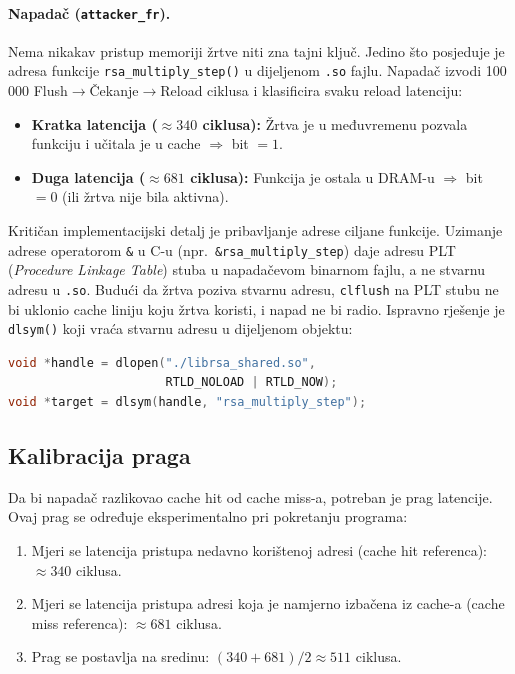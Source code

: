 \paragraph{Napadač (\texttt{attacker\_fr}).}
Nema nikakav pristup memoriji žrtve niti zna tajni ključ. Jedino što posjeduje je adresa funkcije \texttt{rsa\_multiply\_step()} u dijeljenom \texttt{.so} fajlu. Napadač izvodi 100\,000 Flush$\to$Čekanje$\to$Reload ciklusa i klasificira svaku reload latenciju:
\begin{itemize}
\item \textbf{Kratka latencija ($\approx 340$ ciklusa):} Žrtva je u međuvremenu pozvala funkciju i učitala je u cache $\Rightarrow$ bit $= 1$.
\item \textbf{Duga latencija ($\approx 681$ ciklusa):} Funkcija je ostala u DRAM-u $\Rightarrow$ bit $= 0$ (ili žrtva nije bila aktivna).
\end{itemize}

	
Kritičan implementacijski detalj je pribavljanje adrese ciljane funkcije. Uzimanje adrese operatorom \texttt{\&} u C-u (npr.\ \texttt{\&rsa\_multiply\_step}) daje adresu PLT (\textit{Procedure Linkage Table}) stuba u napadačevom binarnom fajlu, a ne stvarnu adresu u \texttt{.so}. Budući da žrtva poziva stvarnu adresu, \texttt{clflush} na PLT stubu ne bi uklonio cache liniju koju žrtva koristi, i napad ne bi radio. Ispravno rješenje je \texttt{dlsym()} koji vraća stvarnu adresu u dijeljenom objektu:

\begin{lstlisting}[language=C, caption={Pribavljanje stvarne adrese ciljane funkcije}, label=lst:fr_dlsym]
void *handle = dlopen("./librsa_shared.so",
                      RTLD_NOLOAD | RTLD_NOW);
void *target = dlsym(handle, "rsa_multiply_step");
\end{lstlisting}

\subsection{Kalibracija praga}

Da bi napadač razlikovao cache hit od cache miss-a, potreban je prag latencije. Ovaj prag se određuje eksperimentalno pri pokretanju programa:
\begin{enumerate}
\item Mjeri se latencija pristupa nedavno korištenoj adresi (cache hit referenca): $\approx 340$ ciklusa.
\item Mjeri se latencija pristupa adresi koja je namjerno izbačena iz cache-a (cache miss referenca): $\approx 681$ ciklusa.
\item Prag se postavlja na sredinu: $(340 + 681) / 2 \approx 511$ ciklusa.
\end{enumerate}

